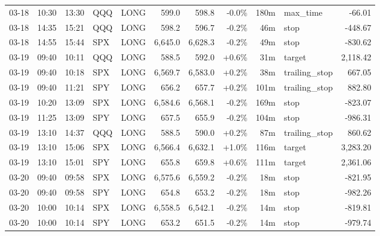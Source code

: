\documentclass[11pt,a4paper,twoside]{article}
\begin{document}
\begin{center}
\begin{longtable}{>{\color{txtmain}}l l l l l r r r r >{\color{txtmain}}l r}
03-18 & 10:30 & 13:30 & QQQ & LONG & 599.0 & 598.8 & \textcolor{lossred}{-0.0\%} & 180m & max\_time & \textcolor{lossred}{-66.01} \\
03-18 & 14:35 & 15:21 & QQQ & LONG & 598.2 & 596.7 & \textcolor{lossred}{-0.2\%} & 46m & stop & \textcolor{lossred}{-448.67} \\
03-18 & 14:55 & 15:44 & SPX & LONG & 6,645.0 & 6,628.3 & \textcolor{lossred}{-0.2\%} & 49m & stop & \textcolor{lossred}{-830.62} \\
03-19 & 09:40 & 10:11 & QQQ & LONG & 588.5 & 592.0 & \textcolor{wingreen}{+0.6\%} & 31m & target & \textcolor{wingreen}{2,118.42} \\
03-19 & 09:40 & 10:18 & SPX & LONG & 6,569.7 & 6,583.0 & \textcolor{wingreen}{+0.2\%} & 38m & trailing\_stop & \textcolor{wingreen}{667.05} \\
03-19 & 09:40 & 11:21 & SPY & LONG & 656.2 & 657.7 & \textcolor{wingreen}{+0.2\%} & 101m & trailing\_stop & \textcolor{wingreen}{882.80} \\
03-19 & 10:20 & 13:09 & SPX & LONG & 6,584.6 & 6,568.1 & \textcolor{lossred}{-0.2\%} & 169m & stop & \textcolor{lossred}{-823.07} \\
03-19 & 11:25 & 13:09 & SPY & LONG & 657.5 & 655.9 & \textcolor{lossred}{-0.2\%} & 104m & stop & \textcolor{lossred}{-986.31} \\
03-19 & 13:10 & 14:37 & QQQ & LONG & 588.5 & 590.0 & \textcolor{wingreen}{+0.2\%} & 87m & trailing\_stop & \textcolor{wingreen}{860.62} \\
03-19 & 13:10 & 15:06 & SPX & LONG & 6,566.4 & 6,632.1 & \textcolor{wingreen}{+1.0\%} & 116m & target & \textcolor{wingreen}{3,283.20} \\
03-19 & 13:10 & 15:01 & SPY & LONG & 655.8 & 659.8 & \textcolor{wingreen}{+0.6\%} & 111m & target & \textcolor{wingreen}{2,361.06} \\
03-20 & 09:40 & 09:58 & SPX & LONG & 6,575.6 & 6,559.2 & \textcolor{lossred}{-0.2\%} & 18m & stop & \textcolor{lossred}{-821.95} \\
03-20 & 09:40 & 09:58 & SPY & LONG & 654.8 & 653.2 & \textcolor{lossred}{-0.2\%} & 18m & stop & \textcolor{lossred}{-982.26} \\
03-20 & 10:00 & 10:14 & SPX & LONG & 6,558.5 & 6,542.1 & \textcolor{lossred}{-0.2\%} & 14m & stop & \textcolor{lossred}{-819.81} \\
03-20 & 10:00 & 10:14 & SPY & LONG & 653.2 & 651.5 & \textcolor{lossred}{-0.2\%} & 14m & stop & \textcolor{lossred}{-979.74} \\

\end{longtable}
\end{center}
\end{document}
